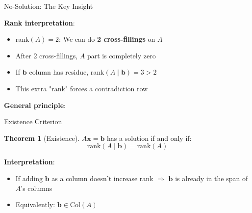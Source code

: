 \documentclass[10pt]{beamer}
\theoremstyle{definition}
\newtheorem{thm}{Theorem}[section]
\newcommand{\x}[1]{\alert{\textbf{#1}}}
\begin{document}
\begin{frame}{No-Solution: The Key Insight}

\x{Rank interpretation}:
\begin{itemize}
\item rank$(A) = 2$: We can do \textbf{2 cross-fillings} on $A$
\item After 2 cross-fillings, $A$ part is completely zero
\item If $\mathbf{b}$ column has residue, rank$(A \mid \mathbf{b}) = 3 > 2$
\item \alert{This extra "rank" forces a contradiction row}
\end{itemize}

\vspace{1em}

\x{General principle}:
\begin{center}
\end{center}

\end{frame}

\begin{frame}{Existence Criterion}

\begin{thm}[Existence]
$A\mathbf{x} = \mathbf{b}$ has a solution if and only if:
$$\text{rank}(A \mid \mathbf{b}) = \text{rank}(A)$$
\end{thm}

\vspace{1em}

\x{Interpretation}:
\begin{itemize}
\item If adding $\mathbf{b}$ as a column doesn't increase rank $\Rightarrow$ $\mathbf{b}$ is already in the span of $A$'s columns
\item Equivalently: $\mathbf{b} \in \text{Col}(A)$
\end{itemize}

\end{frame}
\end{document}
